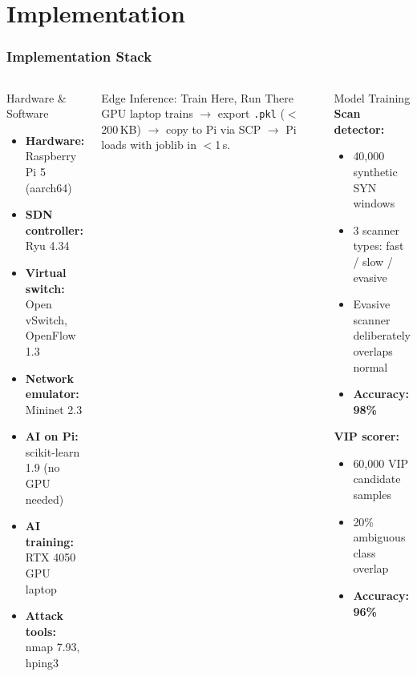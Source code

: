 \documentclass{beamer}
\begin{document}
\section{Implementation}

\begin{frame}
\frametitle{Implementation Stack}

\begin{columns}

\begin{block}{Hardware \& Software}
\begin{itemize}
  \item \textbf{Hardware:} Raspberry Pi 5 (aarch64)
  \item \textbf{SDN controller:} Ryu 4.34
  \item \textbf{Virtual switch:} Open vSwitch, OpenFlow 1.3
  \item \textbf{Network emulator:} Mininet 2.3
  \item \textbf{AI on Pi:} scikit-learn 1.9 (no GPU needed)
  \item \textbf{AI training:} RTX 4050 GPU laptop
  \item \textbf{Attack tools:} nmap 7.93, hping3
\end{itemize}
\end{block}

\begin{block}{Edge Inference: Train Here, Run There}
GPU laptop trains $\to$ export \texttt{.pkl} ($<$200\,KB) $\to$
copy to Pi via SCP $\to$ Pi loads with joblib in $<$1\,s.
\end{block}

\begin{block}{Model Training}
\textbf{Scan detector:}
\begin{itemize}
  \item 40,000 synthetic SYN windows
  \item 3 scanner types: fast / slow / evasive
  \item Evasive scanner deliberately overlaps normal
  \item \textbf{Accuracy: 98\%}
\end{itemize}
\vspace{4pt}
\textbf{VIP scorer:}
\begin{itemize}
  \item 60,000 VIP candidate samples
  \item 20\% ambiguous class overlap
  \item \textbf{Accuracy: 96\%}
\end{itemize}
\end{block}

\end{columns}

\end{frame}
\end{document}
